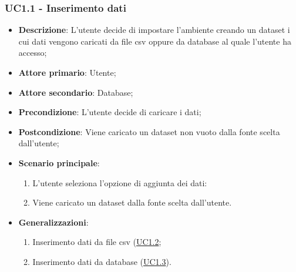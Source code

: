 \subsubsection{UC1.1 - Inserimento dati}
\label{ssub:uc1.1}
\begin{itemize}
    \item \textbf{Descrizione}: L'utente decide di impostare l'ambiente creando un dataset i cui 
                                dati vengono caricati da file csv oppure da database al quale l'utente ha accesso;

    \item \textbf{Attore primario}: Utente;
    \item \textbf{Attore secondario}: Database;
    
    \item \textbf{Precondizione}:   L'utente decide di caricare i dati;

    \item \textbf{Postcondizione}:  Viene caricato un dataset non vuoto dalla fonte scelta dall'utente;

	\item \textbf{Scenario principale}:
		\begin{enumerate}
			\item L'utente seleziona l'opzione di aggiunta dei dati:
            \item Viene caricato un dataset dalla fonte scelta dall'utente.
        \end{enumerate}

        \item \textbf{Generalizzazioni}:
        \begin{enumerate}
            \item Inserimento dati da file csv (\hyperref[ssub:uc1.2]{UC1.2};
            \item Inserimento dati da database (\hyperref[ssub:uc1.3]{UC1.3}).
        \end{enumerate}
\end{itemize}


